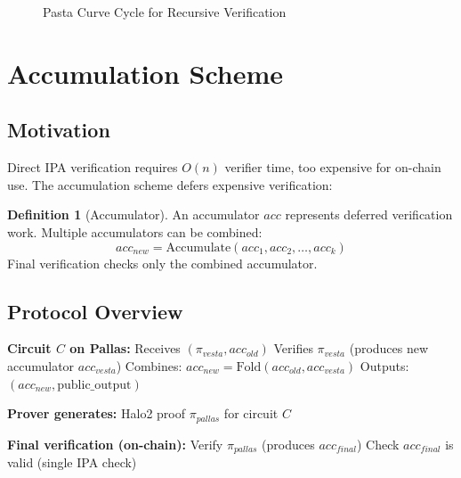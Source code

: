 \documentclass[11pt,a4paper]{article}
\theoremstyle{definition}
\newtheorem{definition}{Definition}
\begin{document}
\begin{figure}[h]
\centering
{}
\caption{Pasta Curve Cycle for Recursive Verification}
\end{figure}

\section{Accumulation Scheme}

\subsection{Motivation}

Direct IPA verification requires $O(n)$ verifier time, too expensive for on-chain use. The accumulation scheme defers expensive verification:

\begin{definition}[Accumulator]
    An accumulator $acc$ represents deferred verification work. Multiple accumulators can be combined:
    \[
    acc_{new} = \text{Accumulate}(acc_1, acc_2, \ldots, acc_k)
    \]
    Final verification checks only the combined accumulator.
\end{definition}

\subsection{Protocol Overview}

\begin{algorithm}
\caption{Accumulation-Based Recursive Verification}
\begin{algorithmic}[1]
\State \textbf{Circuit $C$ on Pallas:}
\State \quad Receives $(\pi_{vesta}, acc_{old})$
\State \quad Verifies $\pi_{vesta}$ (produces new accumulator $acc_{vesta}$)
\State \quad Combines: $acc_{new} = \text{Fold}(acc_{old}, acc_{vesta})$
\State \quad Outputs: $(acc_{new}, \text{public\_output})$

\State \textbf{Prover generates:}
\State \quad Halo2 proof $\pi_{pallas}$ for circuit $C$

\State \textbf{Final verification (on-chain):}
\State \quad Verify $\pi_{pallas}$ (produces $acc_{final}$)
\State \quad Check $acc_{final}$ is valid (single IPA check)
\end{algorithmic}
\end{algorithm}
\end{document}
